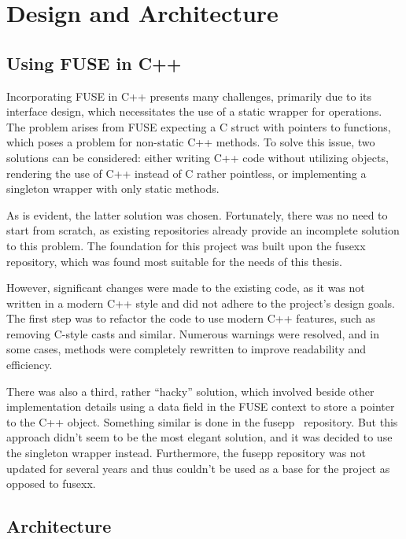 \chapter{Design and Architecture}
\label{chap:design-and-architecture}

\section{Using FUSE in C++}\label{sec:fuse-in-cpp}

Incorporating FUSE in C++ presents many challenges, primarily due to its interface design, which necessitates the use of a static wrapper for operations.
The problem arises from FUSE expecting a C struct with pointers to functions, which poses a problem for non-static C++ methods.
To solve this issue, two solutions can be considered: either writing C++ code without utilizing objects, rendering the use of C++ instead of C rather pointless, or implementing a singleton wrapper with only static methods.

As is evident, the latter solution was chosen.
Fortunately, there was no need to start from scratch, as existing repositories already provide an incomplete solution to this problem.
The foundation for this project was built upon the fusexx~\cite{fusexx} repository, which was found most suitable for the needs of this thesis.

However, significant changes were made to the existing code, as it was not written in a modern C++ style and did not adhere to the project's design goals.
The first step was to refactor the code to use modern C++ features, such as removing C-style casts and similar.
Numerous warnings were resolved, and in some cases, methods were completely rewritten to improve readability and efficiency.

There was also a third, rather ``hacky'' solution, which involved beside other implementation details using a data field in the FUSE context to store a pointer to the C++ object.
Something similar is done in the fusepp~\cite{fusepp} repository.
But this approach didn't seem to be the most elegant solution, and it was decided to use the singleton wrapper instead.
Furthermore, the fusepp repository was not updated for several years and thus couldn't be used as a base for the project as opposed to fusexx.

\section{Architecture}\label{sec:architecture}

